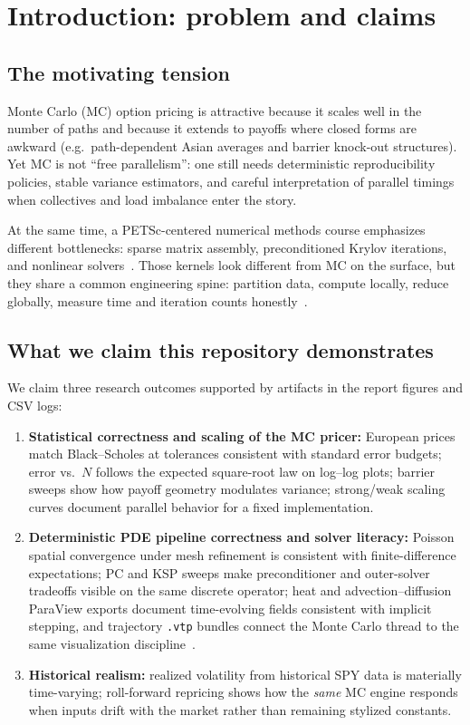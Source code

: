 \documentclass[11pt]{article}
\begin{document}
\newpage

\tableofcontents
\newpage

\section{Introduction: problem and claims}

\subsection{The motivating tension}
Monte Carlo (MC) option pricing is attractive because it scales well in the
number of paths and because it extends to payoffs where closed forms are awkward
(e.g.\ path-dependent Asian averages and barrier knock-out structures). Yet MC is
not ``free parallelism'': one still needs deterministic reproducibility policies,
stable variance estimators, and careful interpretation of parallel timings when
collectives and load imbalance enter the story.

At the same time, a PETSc-centered numerical methods course emphasizes different
bottlenecks: sparse matrix assembly, preconditioned Krylov iterations, and nonlinear
solvers~\cite{bueler2020petsc}. Those kernels look different from MC on the surface,
but they share a common engineering spine: partition data, compute locally,
reduce globally, measure time and iteration counts honestly~\cite{petsc-efficient}.

\subsection{What we claim this repository demonstrates}
We claim three research outcomes supported by artifacts in the report
figures and CSV logs:
\begin{enumerate}[leftmargin=*]
  \item \textbf{Statistical correctness and scaling of the MC pricer:} European
  prices match Black--Scholes at tolerances consistent with standard error budgets;
  error vs.\ $N$ follows the expected square-root law on log--log plots; barrier
  sweeps show how payoff geometry modulates variance; strong/weak scaling curves
  document parallel behavior for a fixed implementation.
  \item \textbf{Deterministic PDE pipeline correctness and solver literacy:} Poisson
  spatial convergence under mesh refinement is consistent with finite-difference
  expectations; PC and KSP sweeps make preconditioner and outer-solver tradeoffs
  visible on the same discrete operator; heat and advection--diffusion ParaView
  exports document time-evolving fields consistent with implicit stepping, and
  trajectory \texttt{.vtp} bundles connect the Monte Carlo thread to the same
  visualization discipline~\cite{paraview-guide}.
  \item \textbf{Historical realism:} realized volatility from historical SPY data is
  materially time-varying; roll-forward repricing shows how the \emph{same} MC
  engine responds when inputs drift with the market rather than remaining stylized
  constants.
\end{enumerate}
\end{document}
